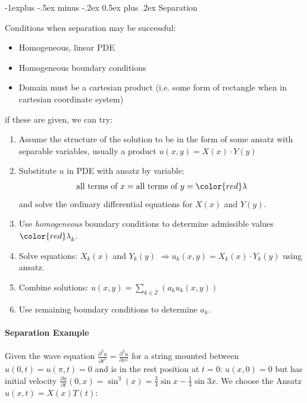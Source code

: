 \documentclass[10pt,landscape]{article}
\makeatletter
\renewcommand{\subsection}{\@startsection{subsection}{2}{0mm}%
                                {-1explus -.5ex minus -.2ex}%
                                {0.5ex plus .2ex}%
                                {\normalfont\normalsize\bfseries}}
\makeatother
\begin{document}
\begin{multicols}{3}
\subsection{Separation}

Conditions when separation may be successful:

\begin{itemize}
	\item Homogeneous, linear PDE
	\item Homogeneous boundary conditions
	\item Domain must be a cartesian product (i.e. some form of rectangle when in cartesian coordinate system)
\end{itemize}

if these are given, we can try:

\begin{enumerate}
	\item Assume the structure of the solution to be in the form of some ansatz with separable variables, usually a product $u(x,y)=X(x)\cdot Y(y)$
	\item{
		Substitute $u$ in PDE with ansatz by variable:
		\begin{align*}
			\text{all terms of }x = \text{all terms of }y = {\color{red}\lambda}
		\end{align*}
		and solve the ordinary differential equations for $X(x)$ and $Y(y)$.
	}
	\item Use \emph{homogeneous} boundary conditions to determine admissible values ${\color{red}\lambda}_k$.
	\item Solve equations: $X_k(x)$ and $Y_k(y)$ $\Rightarrow u_k(x,y)=X_k(x)\cdot Y_k(y)$ using ansatz.
	\item Combine solutions: $u(x,y)=\sum_{k\in \mathbb{Z}}\left(a_ku_k(x,y)\right)$
	\item Use remaining boundary conditions to determine $a_k$.
\end{enumerate}

\paragraph{Separation Example}

Given the wave equation $\frac{\partial^2u}{\partial t^2}=\frac{\partial^2 u}{\partial x^2}$
for a string mounted between $u(0,t)=u(\pi,t)=0$ and is in the rest position at $t=0$: $u(x,0)=0$ but has initial velocity
$\frac{\partial u}{\partial t}(0,x)=\sin^3(x)=\frac{3}{4}\sin x-\frac{1}{4}\sin 3x$. We choose the Ansatz $u(x,t)=X(x)T(t)$:


\end{multicols}
\end{document}
